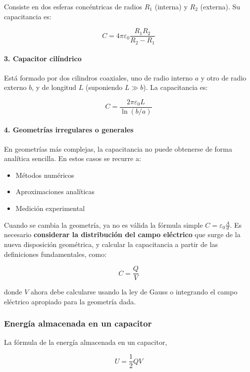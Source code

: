 Consiste en dos esferas concéntricas de radios \( R_1 \) (interna) y \( R_2 \) (externa). Su capacitancia es:

\[
C = 4\pi \varepsilon_0 \frac{R_1 R_2}{R_2 - R_1}
\]

\paragraph{3. Capacitor cilíndrico}

Está formado por dos cilindros coaxiales, uno de radio interno \( a \) y otro de radio externo \( b \), y de longitud \( L \) (suponiendo \( L \gg b \)). La capacitancia es:

\[
C = \frac{2\pi \varepsilon_0 L}{\ln(b/a)}
\]

\paragraph{4. Geometrías irregulares o generales}

En geometrías más complejas, la capacitancia no puede obtenerse de forma analítica sencilla. En estos casos se recurre a:

\begin{itemize}
    \item Métodos numéricos
    \item Aproximaciones analíticas
    \item Medición experimental
\end{itemize}

Cuando se cambia la geometría, ya no es válida la fórmula simple \( C = \varepsilon_0 \frac{A}{d} \). Es necesario \textbf{considerar la distribución del campo eléctrico} que surge de la nueva disposición geométrica, y calcular la capacitancia a partir de las definiciones fundamentales, como:

\[
C = \frac{Q}{V}
\]

donde \( V \) ahora debe calcularse usando la ley de Gauss o integrando el campo eléctrico apropiado para la geometría dada.

\subsubsection{Energía almacenada en un capacitor}

La fórmula de la energía almacenada en un capacitor,

\begin{equation}
    U = \frac{1}{2} QV
\end{equation}

